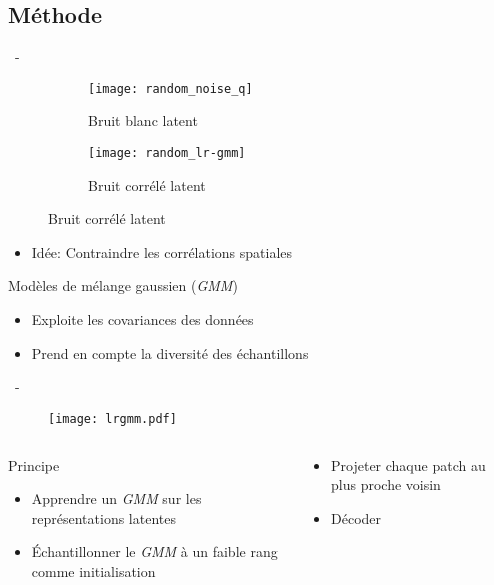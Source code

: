 \documentclass[aspectratio=169, 22pt]{beamer}
\begin{document}
\subsection{Méthode}
\begin{frame}{\secname~- \subsecname}
  \begin{figure}\centering
    \begin{subfigure}{0.3\linewidth}\centering
      \texttt{[image: random\_noise\_q]}
      \caption{Bruit blanc latent}
    \end{subfigure}
    \begin{subfigure}{0.3\linewidth}\centering
      \texttt{[image: random\_lr-gmm]}
      \caption{Bruit corrélé latent}
    \end{subfigure}
  \end{figure}
  \begin{itemize}\centering
  \item \alert{Idée}: Contraindre les \alert{corrélations spatiales} 
  \end{itemize}
  \begin{exampleblock}{Modèles de mélange gaussien (\emph{GMM})}
    \begin{itemize}
    \item Exploite les covariances des données
    \item Prend en compte la diversité des échantillons
    \end{itemize}
  \end{exampleblock}  
\end{frame}
\begin{frame}{\secname~- \subsecname}
  \begin{figure}
    \texttt{[image: lrgmm.pdf]}
  \end{figure}
  \begin{columns}
    \begin{column}{0.5\linewidth}
      \begin{exampleblock}{Principe}
        \begin{itemize}
        \item \small Apprendre un \emph{GMM} sur les représentations latentes
        \item \small Échantillonner le \emph{GMM} à un faible rang comme initialisation
        \end{itemize}
      \end{exampleblock}
    \end{column}
    \begin{column}{0.5\linewidth}
        \begin{exampleblock}{}
        \begin{itemize}
        \item \small Projeter chaque patch au plus proche voisin
        \item \small Décoder
        \end{itemize}
      \end{exampleblock}
    \end{column}
  \end{columns}
  
\end{frame}
\end{document}
